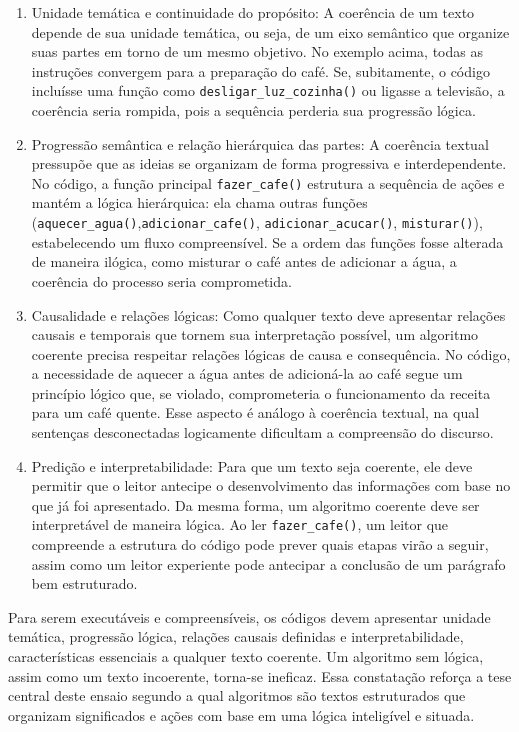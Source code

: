 \documentclass[portuguese]{textolivre}
\begin{document}
\begin{enumerate}
    \item Unidade temática e continuidade do propósito: A coerência de um texto depende de sua unidade temática, ou seja, de um eixo semântico que organize suas partes em torno de um mesmo objetivo. No exemplo acima, todas as instruções convergem para a preparação do café. Se, subitamente, o código incluísse uma função como \lstinline[language=Python]{desligar_luz_cozinha()} ou ligasse a televisão, a coerência seria rompida, pois a sequência perderia sua progressão lógica.
    \item Progressão semântica e relação hierárquica das partes: A coerência textual pressupõe que as ideias se organizam de forma progressiva e interdependente. No código, a função principal \lstinline[language=Python]{fazer_cafe()} estrutura a sequência de ações e mantém a lógica hierárquica: ela chama outras funções (\lstinline[language=Python]{aquecer_agua()},\lstinline[language=Python]{adicionar_cafe()}, \lstinline[language=Python]{adicionar_acucar()}, \lstinline[language=Python]{misturar()}), estabelecendo um fluxo compreensível. Se a ordem das funções fosse alterada de maneira ilógica, como misturar o café antes de adicionar a água, a coerência do processo seria comprometida.
    \item Causalidade e relações lógicas: Como qualquer texto deve apresentar relações causais e temporais que tornem sua interpretação possível, um algoritmo coerente precisa respeitar relações lógicas de causa e consequência. No código, a necessidade de aquecer a água antes de adicioná-la ao café segue um princípio lógico que, se violado, comprometeria o funcionamento da receita para um café quente. Esse aspecto é análogo à coerência textual, na qual sentenças desconectadas logicamente dificultam a compreensão do discurso.
    \item Predição e interpretabilidade: Para que um texto seja coerente, ele deve permitir que o leitor antecipe o desenvolvimento das informações com base no que já foi apresentado. Da mesma forma, um algoritmo coerente deve ser interpretável de maneira lógica. Ao ler \lstinline[language=Python]{fazer_cafe()}, um leitor que compreende a estrutura do código pode prever quais etapas virão a seguir, assim como um leitor experiente pode antecipar a conclusão de um parágrafo bem estruturado.
\end{enumerate}
    
Para serem executáveis e compreensíveis, os códigos devem apresentar unidade temática, progressão lógica, relações causais definidas e interpretabilidade, características essenciais a qualquer texto coerente. Um algoritmo sem lógica, assim como um texto incoerente, torna-se ineficaz. Essa constatação reforça a tese central deste ensaio segundo a qual algoritmos são textos estruturados que organizam significados e ações com base em uma lógica inteligível e situada.
\end{document}
